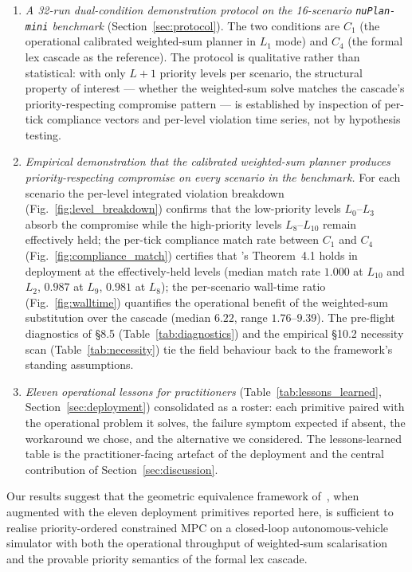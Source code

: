 \begin{enumerate}
    \item \emph{A 32-run dual-condition demonstration protocol on the 16-scenario \texttt{nuPlan-mini} benchmark} (Section~\ref{sec:protocol}). The two conditions are $C_1$ (the operational calibrated weighted-sum planner in $L_1$ mode) and $C_4$ (the formal lex cascade as the reference). The protocol is qualitative rather than statistical: with only $L+1$ priority levels per scenario, the structural property of interest --- whether the weighted-sum solve matches the cascade's priority-respecting compromise pattern --- is established by inspection of per-tick compliance vectors and per-level violation time series, not by hypothesis testing.

    \item \emph{Empirical demonstration that the calibrated weighted-sum planner produces priority-respecting compromise on every scenario in the benchmark.} For each scenario the per-level integrated violation breakdown (Fig.~\ref{fig:level_breakdown}) confirms that the low-priority levels $L_0$--$L_3$ absorb the compromise while the high-priority levels $L_8$--$L_{10}$ remain effectively held; the per-tick compliance match rate between $C_1$ and $C_4$ (Fig.~\ref{fig:compliance_match}) certifies that \cite{lcp2025}'s Theorem~4.1 holds in deployment at the effectively-held levels (median match rate $1.000$ at $L_{10}$ and $L_2$, $0.987$ at $L_9$, $0.981$ at $L_8$); the per-scenario wall-time ratio (Fig.~\ref{fig:walltime}) quantifies the operational benefit of the weighted-sum substitution over the cascade (median $6.22$, range $1.76$--$9.39$). The pre-flight diagnostics of \cite{lcp2025} \S8.5 (Table~\ref{tab:diagnostics}) and the empirical \S10.2 necessity scan (Table~\ref{tab:necessity}) tie the field behaviour back to the framework's standing assumptions.

    \item \emph{Eleven operational lessons for practitioners} (Table~\ref{tab:lessons_learned}, Section~\ref{sec:deployment}) consolidated as a roster: each primitive paired with the operational problem it solves, the failure symptom expected if absent, the workaround we chose, and the alternative we considered. The lessons-learned table is the practitioner-facing artefact of the deployment and the central contribution of Section~\ref{sec:discussion}.
\end{enumerate}

Our results suggest that the geometric equivalence framework of~\cite{lcp2025}, when augmented with the eleven deployment primitives reported here, is sufficient to realise priority-ordered constrained MPC on a closed-loop autonomous-vehicle simulator with both the operational throughput of weighted-sum scalarisation and the provable priority semantics of the formal lex cascade.

